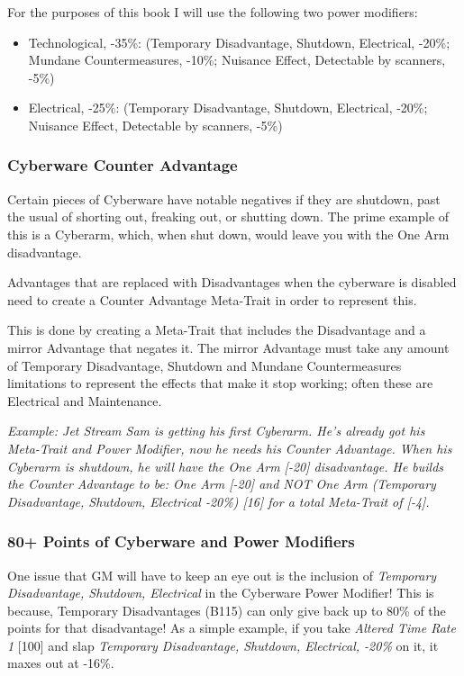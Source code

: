 \begin{multicols*}{3}
	For the purposes of this book I will use the following two power modifiers:
	
	\begin{itemize}
		\item Technological, -35\%: (Temporary Disadvantage, Shutdown, Electrical,  -20\%; Mundane Countermeasures, -10\%; Nuisance Effect, Detectable by scanners, -5\%)
		\item Electrical, -25\%: (Temporary Disadvantage, Shutdown, Electrical, -20\%; Nuisance Effect, Detectable by scanners, -5\%)
	\end{itemize}
	
	\subsubsection{Cyberware Counter Advantage}
	
	Certain pieces of Cyberware have notable negatives if they are shutdown, past the usual of shorting out, freaking out, or shutting down. The prime example of this is a Cyberarm, which, when shut down, would leave you with the One Arm disadvantage. 
	
	Advantages that are replaced with Disadvantages when the cyberware is disabled need to create a Counter Advantage Meta-Trait in order to represent this.
	
	This is done by creating a Meta-Trait that includes the Disadvantage and a mirror Advantage that negates it. The mirror Advantage must take any amount of Temporary Disadvantage, Shutdown and Mundane Countermeasures limitations to represent the effects that make it stop working; often these are Electrical and Maintenance.
	
	\textit{\textcolor{OliveGreen}{Example: Jet Stream Sam is getting his first Cyberarm. He's already got his Meta-Trait and Power Modifier, now he needs his Counter Advantage. When his Cyberarm is shutdown, he will have the One Arm [-20] disadvantage. He builds the Counter Advantage to be: One Arm [-20] and NOT One Arm (Temporary Disadvantage, Shutdown, Electrical -20\%) [16] for a total Meta-Trait of [-4].}}
	
	\subsubsection{80+ Points of Cyberware and Power Modifiers}
	
	One issue that GM will have to keep an eye out is the inclusion of \textit{Temporary Disadvantage, Shutdown, Electrical} in the Cyberware Power Modifier! This is because, Temporary Disadvantages (B115) can only give back up to 80\% of the points for that disadvantage! As a simple example, if you take \textit{Altered Time Rate 1} [100] and slap \textit{Temporary Disadvantage, Shutdown, Electrical, -20\%} on it, it maxes out at -16\%.
	

\end{multicols*}
